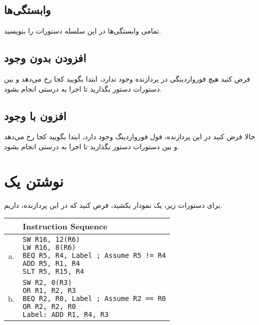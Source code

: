 \documentclass[11pt, dvipsnames, svgnames, x11names]{article}
\begin{document}
\subsection{وابستگی‌ها}
تمامی وابستگی‌ها در این سلسله دستورات را بنویسید.

\subsection{افزودن  بدون وجود }
فرض کنید هیچ فورواردینگی در پردازنده وجود ندارد، ابتدا بگویید کجا
رخ می‌دهد و بین دستورات دستور 
بگذارید تا اجرا به درستی انجام بشود.

\subsection{افزون  با وجود }
حالا فرض کنید در این پردازنده، فول فورواردینگ وجود دارد، ابتدا بگویید کجا
رخ می‌دهد و بین دستورات دستور 
بگذارید تا اجرا به درستی انجام بشود.

\section{نوشتن یک }
برای دستورات زیر، یک نمودار
بکشید، فرض کنید که در این پردازنده‌،  داریم.

\begin{latin}
\begin{table}[H]
\begin{center}
\begin{tabular}{|c|l|}
\hline
& Instruction Sequence \\
\hline
a. &
\makecell[l]{
\texttt{SW R16, 12(R6)} \\ 
\texttt{LW R16, 8(R6)} \\ 
\texttt{BEQ R5, R4, Label ; Assume R5 != R4} \\
\texttt{ADD R5, R1, R4} \\ 
\texttt{SLT R5, R15, R4}} \\
\hline
b. &
\makecell[l]{
\texttt{SW R2, 0(R3)} \\ 
\texttt{OR R1, R2, R3} \\ 
\texttt{BEQ R2, R0, Label ; Assume R2 == R0} \\
\texttt{OR R2, R2, R0} \\
\texttt{Label: ADD R1, R4, R3}}\\
\hline
\end{tabular}
\end{center}
\end{table}
\end{latin}
\end{document}
